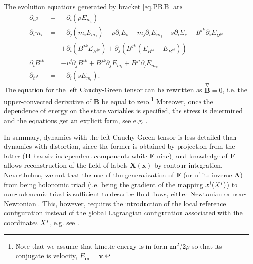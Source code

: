 \documentclass[
10pt, %
a4paper, %
oneside, %
headinclude,footinclude, %
BCOR5mm, %
]{scrartcl}
\newcommand{\xx}{\mathbf{x}}
\newcommand{\XX}{\mathbf{X}}
\newcommand{\mm}{\mathbf{m}}
\newcommand{\vv}{\mathbf{v}}
\newcommand{\FF}{\mathbf{F}}
\renewcommand{\AA}{\mathbf{A}}
\newcommand{\BB}{\mathbf{B}}
\newcommand{\IP}[1]{{\color{Red}IP:\ \ #1}}
\newcommand{\VK}[1]{{\color{Cyan}VK:\ \ #1}}
\newcommand{\sI}{{\mathsmaller I}}
\begin{document}
The evolution equations generated by bracket \eqref{eq.PB.B} are
\begin{subequations}
	\begin{eqnarray}
	\partial_t \rho &=& -\partial_i(\rho E_{m_i})\\
	\partial_t m_i &=& -\partial_j(m_i E_{m_j})-\rho\partial_i E_\rho - m_j \partial_i E_{m_j} -s \partial_i E_s - B^{jk}\partial_i E_{B^{jk}} \nonumber\\
	&&+\partial_i(B^{jk}E_{B^{jk}}) + \partial_j(B^{jk}(E_{B^{ik}}+E_{B^{ki}}))\\
	\partial_t B^{ik} &=& -v^j \partial_j B^{ik} + B^{jk}\partial_j E_{m_i} + B^{ji}\partial_j E_{m_k}\\
	\partial_t s &=& -\partial_i(s E_{m_i}).
	\end{eqnarray}
\end{subequations}
The equation for the left Cauchy-Green tensor can be rewritten as 
$\stackrel{\nabla}{\BB}=0$, i.e. the upper-convected derivative of $\BB$ be 
equal to zero.\footnote{Note that we assume that kinetic energy is in form $\mm^2/2\rho$ so that its conjugate is velocity, $E_\mm = \vv$.}
Moreover, once the dependence of energy on the state variables is specified, 
the stress is determined and the equations get an explicit form, see e.g. 
\cite{PKG}.

In summary, dynamics with the left Cauchy-Green tensor is less detailed than 
dynamics with distortion, since the former is obtained by projection from the 
latter ($\BB$ has six independent components while $\FF$ nine), and knowledge 
of $\FF$ allows reconstruction of the field of labels $\XX(\xx)$ by contour 
integration. Nevertheless, we not that the use of the generalization of $ \FF $ 
(or of its inverse $ \AA $) from being holonomic triad (i.e. being the gradient 
of 
the mapping $ x^i(X^\sI) $) to non-holonomic triad is sufficient to describe 
fluid flows, either Newtonian \cite{DPRZ2016} or non-Newtonian 
\cite{Jackson2018}. This, however, requires the introduction of the local 
reference configuration instead of the global Lagrangian configuration 
associated with the coordinates $ X^\sI $, e.g. see \cite{PRD-Torsion2019}.
\end{document}
